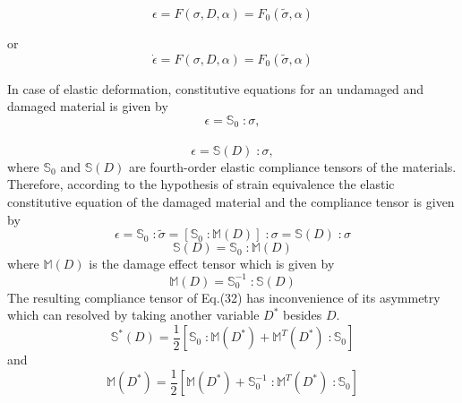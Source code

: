 \documentclass[a4paper,12pt]{article}
\begin{document}
\begin{equation}
    	\epsilon = F(\sigma, D, \alpha)  = F_{0}(\tilde{\sigma}, \alpha)
\end{equation}

or 
\begin{equation}
    	\dot{\epsilon} = F(\sigma, D, \alpha)  = F_{0}(\tilde{\sigma}, \alpha)
\end{equation}

In case of elastic deformation, constitutive equations for an undamaged and damaged material is given by
\begin{equation}
\epsilon = \mathbb{S}_{0}\; : \sigma,
\end{equation}\\
\begin{equation}
\epsilon = \mathbb{S}(D)\; : \sigma,
\end{equation}
where $\mathbb{S}_{0}$ and $\mathbb{S}(D)$  are fourth-order elastic compliance tensors of the materials.
\indent Therefore, according to the hypothesis of strain equivalence the elastic constitutive equation of the damaged material and the compliance tensor is given by 
\begin{equation}
\epsilon = \mathbb{S}_{0}\; : \tilde{\sigma}  =  [\mathbb{S}_{0}\;: \mathbb{M} (D)]\;: \sigma = \mathbb{S}(D)\; : \sigma
\end{equation}
\begin{equation}
\mathbb{S}(D) = \mathbb{S}_{0}\; : \mathbb{M} (D)
\end{equation}
where $\mathbb{M} (D)$ is the damage effect tensor which is given by 
\begin{equation}
\mathbb{M} (D)  = \mathbb{S}_{0}^{-1} \; : \mathbb{S}(D) 
\end{equation}
The resulting compliance tensor of Eq.(32) has inconvenience of its asymmetry which can resolved by taking another variable $D^{*}$ besides $D$.
\begin{equation}
	\mathbb{S}^{*} (D)  = \frac{1}{2} [ \mathbb{S}_{0} \; :  \mathbb{M} (D^{*}) + \mathbb{M}^{T} (D^{*})\; : \mathbb{S}_{0} ]
\end{equation}
and
\begin{equation}
	\mathbb{M} (D^{*})  =  \frac{1}{2}  [ \mathbb{M} (D^{*}) +  \mathbb{S}_{0}^{-1}\; : \mathbb{M}^{T} (D^{*})\; : \mathbb{S}_{0} ]
\end{equation}
\end{document}
